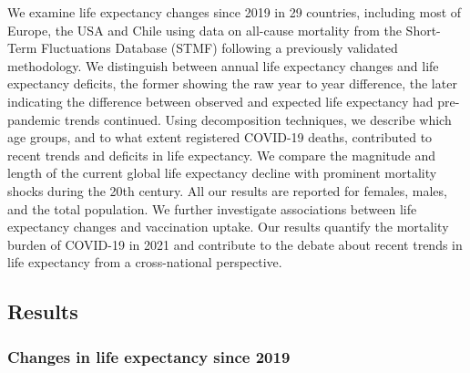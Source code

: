 \documentclass[12pt]{article}
\begin{document}
We examine life expectancy changes since 2019 in 29 countries, including most of Europe, the USA and Chile using data on all-cause mortality from the Short-Term Fluctuations Database (STMF)\cite{Nemeth2021} following a previously validated methodology.\cite{Aburto2021b} We distinguish between annual life expectancy changes and life expectancy deficits, the former showing the raw year to year difference, the later indicating the difference between observed and expected life expectancy had pre-pandemic trends continued. Using decomposition techniques, we describe which age groups, and to what extent registered COVID-19 deaths, contributed to recent trends and deficits in life expectancy. We compare the magnitude and length of the current global life expectancy decline with prominent mortality shocks during the 20th century. All our results are reported for females, males, and the total population. We further investigate associations between life expectancy changes and vaccination uptake. Our results quantify the mortality burden of COVID-19 in 2021 and contribute to the debate about recent trends in life expectancy from a cross-national perspective.

\subsection*{Results}

\subsubsection*{Changes in life expectancy since 2019}
\end{document}
